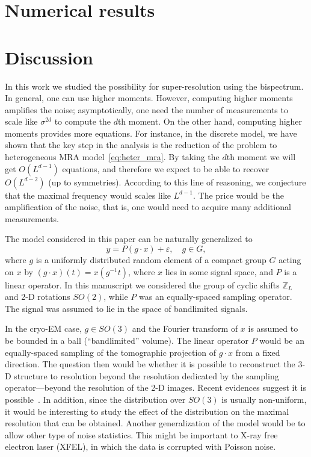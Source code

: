 \documentclass[english,12pt]{article}
\newcommand{\TODO}[1]{{\color{red}{[#1]}}}
\numberwithin{equation}{section}
\numberwithin{thm}{section} %
\begin{document}
\section{Numerical results}


\section{Discussion} \label{sec:future_work}


In this work we studied the possibility for super-resolution using the bispectrum. In general, one can use higher moments. However, computing higher moments amplifies the noise; asymptotically, one need the number of measurements to scale like $\sigma^{2d}$ to compute the $d$th moment. On the other hand, computing higher moments provides more equations. For instance, in the discrete model, we have shown that the key step in the analysis is the reduction of the problem to heterogeneous MRA model~\eqref{eq:heter_mra}.  By taking the $d$th moment we will get  $O(L^{d-1})$ equations, and therefore we expect to be able to recover $O(L^{d-2})$ (up to symmetries). According to this line of reasoning, we conjecture that the maximal frequency would scales like $L^{d-1}$. The price would be the amplification of the noise, that is, one would need to acquire many additional measurements.  

The model considered in this paper can be naturally generalized to 
\begin{equation} \label{eq:general_model}
y = P (g\cdot x) + \varepsilon,\quad g\in G,
\end{equation}
where $g$ is a uniformly distributed random element of a compact group $G$ acting on $x$ by $(g\cdot x)(t) = x(g^{-1}t)$, where $x$ lies in some signal space, and $P$ is a linear operator.  In this manuscript we considered the group of cyclic shifts $\mathbb{Z}_L$ and 2-D rotations $SO(2)$, while $P$ was an equally-spaced sampling operator. The signal was assumed to lie in the space of bandlimited signals.  \TODO{Refs to papers on bispectrum for general groups}

In the cryo-EM case, $g\in SO(3)$ and the Fourier transform of $x$ is assumed to be bounded in a ball (``bandlimited'' volume). The linear operator $P$ would be an equally-spaced sampling of the tomographic projection of $g\cdot x$ from a fixed direction. The question then would be whether it is possible to reconstruct the 3-D structure to resolution beyond the resolution dedicated by the sampling operator---beyond the resolution of the 2-D images. Recent evidences suggest it is possible~\cite{chen2018single}. In addition, since the distribution over $SO(3)$ is usually non-uniform, it would be interesting to study the effect of the distribution on the maximal resolution that can be obtained. Another generalization of the model would be to allow other type of noise statistics. This might be important to X-ray free electron laser (XFEL), in which the data is corrupted with Poisson noise.
 
\end{document}
